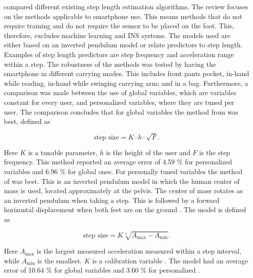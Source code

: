 \citet{Vezocnik2019} compared different existing step length estimation algorithms. The review focuses on the methods applicable to smartphone use. This means methods that do not require training and do not require the sensor to be placed on the foot. This, therefore, excludes machine learning and INS systems. The models used are either based on an inverted pendulum model or relate predictors to step length. Examples of step length predictors are step frequency and acceleration range within a step. The robustness of the methods was tested by having the smartphone in different carrying modes. This includes front pants pocket, in-hand while reading, in-hand while  swinging carrying arm; and in a bag. Furthermore, a comparison was made between the use of global variables, which are variables constant for every user, and personalized variables, where they are tuned per user. The comparison concludes that for global variables the method from \cite{Tian2016} was best, defined as

\begin{equation}
	\label{eq:Tian2016_sle}
	\text{step size} = K \cdot h \cdot \sqrt{F}.
\end{equation}

Here $K$ is a tunable parameter, $h$ is the height of the user and $F$ is the step frequency. This method reported an average error of  4.59 \% for personalized variables and 6.96 \% for global ones. For personally tuned variables the method of \cite{Weinberg2002} was best. This is an inverted pendulum model in which the human center of mass is used, located approximately at the pelvis. The center of mass rotates as an inverted pendulum when taking a step. This is followed by a forward horizontal displacement when both feet are on the ground \cite{Diez2018}. The model is defined as 

\begin{equation}
	\text{step size} =K \sqrt[4]{A_{\max }-A_{\min }}.
	\label{eq:weinberg_stepsize}
\end{equation}

Here $A_{\max}$ is the largest measured acceleration measured within a step interval, while $A_{\min}$ is the smallest. $K$ is a calibration variable  \cite{Weinberg2002,Diez2018}. The model had an average error of  10.64 \% for global variables and  3.60 \% for personalized \cite{Vezocnik2019}.



